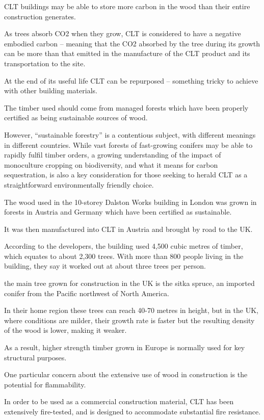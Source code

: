 \documentclass[
]{book}
\begin{document}
CLT buildings may be able to store more carbon in the wood than their entire construction generates.

As trees absorb CO2 when they grow, CLT is considered to have a negative embodied carbon -- meaning that the CO2 absorbed by the tree during its growth can be more than that emitted in the manufacture of the CLT product and its transportation to the site.

At the end of its useful life CLT can be repurposed -- something tricky to achieve with other building materials.

The timber used should come from managed forests which have been properly certified as being sustainable sources of wood.

However, ``sustainable forestry'' is a contentious subject, with different meanings in different countries. While vast forests of fast-growing conifers may be able to rapidly fulfil timber orders, a growing understanding of the impact of monoculture cropping on biodiversity, and what it means for carbon sequestration, is also a key consideration for those seeking to herald CLT as a straightforward environmentally friendly choice.

The wood used in the 10-storey Dalston Works building in London was grown in forests in Austria and Germany which have been certified as sustainable.

It was then manufactured into CLT in Austria and brought by road to the UK.

According to the developers, the building used 4,500 cubic metres of timber, which equates to about 2,300 trees. With more than 800 people living in the building, they say it worked out at about three trees per person.

the main tree grown for construction in the UK is the sitka spruce, an imported conifer from the Pacific northwest of North America.

In their home region these trees can reach 40-70 metres in height, but in the UK, where conditions are milder, their growth rate is faster but the resulting density of the wood is lower, making it weaker.

As a result, higher strength timber grown in Europe is normally used for key structural purposes.

One particular concern about the extensive use of wood in construction is the potential for flammability.

In order to be used as a commercial construction material, CLT has been extensively fire-tested, and is designed to accommodate substantial fire resistance.
\end{document}
